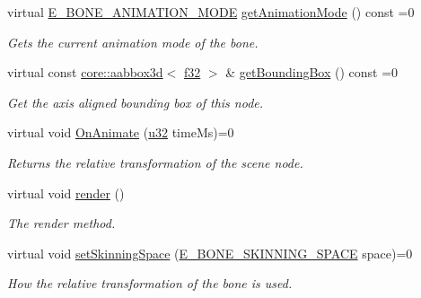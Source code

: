 \begin{DoxyCompactItemize}
virtual \hyperlink{namespaceirr_1_1scene_a318162c0a3aad1cf228ed7daddd44801}{E\+\_\+\+B\+O\+N\+E\+\_\+\+A\+N\+I\+M\+A\+T\+I\+O\+N\+\_\+\+M\+O\+DE} \hyperlink{classirr_1_1scene_1_1IBoneSceneNode_a332e040471057cf6a1a0ae8dfa2c0f5f}{get\+Animation\+Mode} () const =0
\begin{DoxyCompactList}\small\item\em Gets the current animation mode of the bone. \end{DoxyCompactList}\item 
\mbox{\label{classirr_1_1scene_1_1IBoneSceneNode_ac5d0a610b0a24a7501f29ad000d28b3b}} 
virtual const \hyperlink{classirr_1_1core_1_1aabbox3d}{core\+::aabbox3d}$<$ \hyperlink{namespaceirr_a0277be98d67dc26ff93b1a6a1d086b07}{f32} $>$ \& \hyperlink{classirr_1_1scene_1_1IBoneSceneNode_ac5d0a610b0a24a7501f29ad000d28b3b}{get\+Bounding\+Box} () const =0
\begin{DoxyCompactList}\small\item\em Get the axis aligned bounding box of this node. \end{DoxyCompactList}\item 
virtual void \hyperlink{classirr_1_1scene_1_1IBoneSceneNode_a7e21d0722e5b105e4d2a956bff110a7f}{On\+Animate} (\hyperlink{namespaceirr_a0416a53257075833e7002efd0a18e804}{u32} time\+Ms)=0
\begin{DoxyCompactList}\small\item\em Returns the relative transformation of the scene node. \end{DoxyCompactList}\item 
virtual void \hyperlink{classirr_1_1scene_1_1IBoneSceneNode_ac942248f09d2db69804ea47476e3829e}{render} ()
\begin{DoxyCompactList}\small\item\em The render method. \end{DoxyCompactList}\item 
\mbox{\label{classirr_1_1scene_1_1IBoneSceneNode_a071c9edb957b67f18c8285fe7670f9d4}} 
virtual void \hyperlink{classirr_1_1scene_1_1IBoneSceneNode_a071c9edb957b67f18c8285fe7670f9d4}{set\+Skinning\+Space} (\hyperlink{namespaceirr_1_1scene_a47bfc785c34c953f926c920cd13ba1fb}{E\+\_\+\+B\+O\+N\+E\+\_\+\+S\+K\+I\+N\+N\+I\+N\+G\+\_\+\+S\+P\+A\+CE} space)=0
\begin{DoxyCompactList}\small\item\em How the relative transformation of the bone is used. \end{DoxyCompactList}\item 

\end{DoxyCompactItemize}
